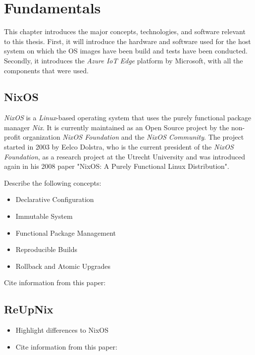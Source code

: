 \chapter{Fundamentals}
\label{sec:fundamentals}
This chapter introduces the major concepts, technologies,
and software relevant to this thesis. First, it will
introduce the hardware and software used for the host system
on which the \ac{OS} images have been build and tests have been
conducted. Secondly, it introduces the \textit{Azure IoT Edge}
platform by Microsoft, with all the components that were used.




\section{NixOS}
\textit{NixOS} is a \textit{Linux}-based operating system that uses the purely
functional package manager \textit{Nix}. It is currently maintained as
an Open Source project by the non-profit organization \textit{NixOS Foundation}
and the \textit{NixOS Community}. The project started in 2003 by Eelco Dolstra,
who is the current president of the \textit{NixOS Foundation}, as
a research project at the Utrecht University\cite{dolstra2003} and was introduced again in his 2008
paper "NixOS: A Purely Functional Linux Distribution".

\begin{tcolorbox}[title=TODO]
Describe the following concepts:
\begin{itemize}
    \item Declarative Configuration
    \item Immutable System
    \item Functional Package Management
    \item Reproducible Builds
    \item Rollback and Atomic Upgrades
\end{itemize}

    Cite information from this paper: \cite{1411255}
\end{tcolorbox}

\section{ReUpNix}

\begin{tcolorbox}[title=TODO]
    \begin{itemize}
        \item Highlight differences to NixOS
        \item Cite information from this paper: \cite{gollenstede:23:lctes}
    \end{itemize}
\end{tcolorbox}

